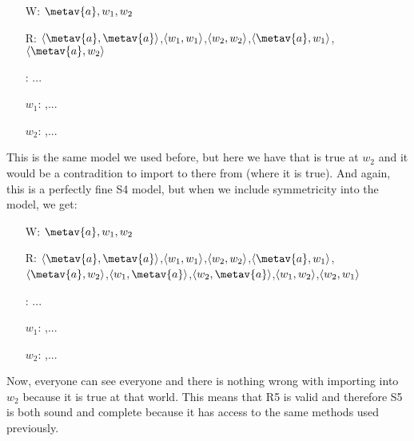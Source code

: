 \begin{center}
\end{center}
\begin{itemize}
\item[W:] $\metav{a},w_1,w_2$
\item[R:] $\openntuple \metav{a},\metav{a}\closentuple$,$\langle w_1,w_1\rangle$,$\langle w_2,w_2\rangle$,$\openntuple \metav{a},w_1\closentuple$,$\openntuple \metav{a},w_2\closentuple$  
\item[\metav{a}:] ... 
\item[$w_1$:] ,...
\item[$w_2$:] \enot{},...
\end{itemize}
This is the same model we used before, but here we have that \enot\ediamond{} is true at $w_2$ and it would be a contradition to import \ediamond{} to there from  (where it is true). And again, this is a perfectly fine S4 model, but when we include symmetricity into the model, we get: 

\begin{center}
\end{center}
\begin{itemize}
\item[W:] $\metav{a},w_1,w_2$
\item[R:] $\openntuple \metav{a},\metav{a}\closentuple$,$\langle w_1,w_1\rangle$,$\langle w_2,w_2\rangle$,$\openntuple \metav{a},w_1\closentuple$,$\openntuple \metav{a},w_2\closentuple$,$\openntuple w_1, \metav{a}\closentuple$,$\openntuple w_2, \metav{a}\closentuple$,$\langle w_1,w_2\rangle$,$\langle w_2,w_1\rangle$    
\item[\metav{a}:] ... 
\item[$w_1$:] ,...
\item[$w_2$:] \enot{},...
\end{itemize}
 
 Now, everyone can see everyone and there is nothing wrong with importing \ediamond{} into $w_2$ because it is true at that world. This means that R5 is valid and therefore S5 is both sound and complete because it has access to the same methods used previously. 

